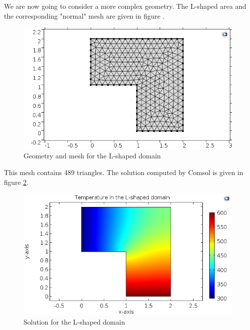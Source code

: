 We are now going to consider a more complex geometry. The L-shaped area and the corresponding "normal" mesh are given in figure .

\begin{figure}
\begin{center}
\includegraphics[scale=0.6]{Lmesh.png}
\caption{Geometry and mesh for the L-shaped domain}
\label{Lmesh}
\end{center} 
\end{figure}

This mesh contains 489 triangles. The solution computed by Comsol is given in figure \ref{laplaceL}.

\begin{figure}
\begin{center}
\includegraphics[scale=0.6]{laplaceL.png}
\caption{Solution for the L-shaped domain}
\label{laplaceL}
\end{center}
\end{figure}